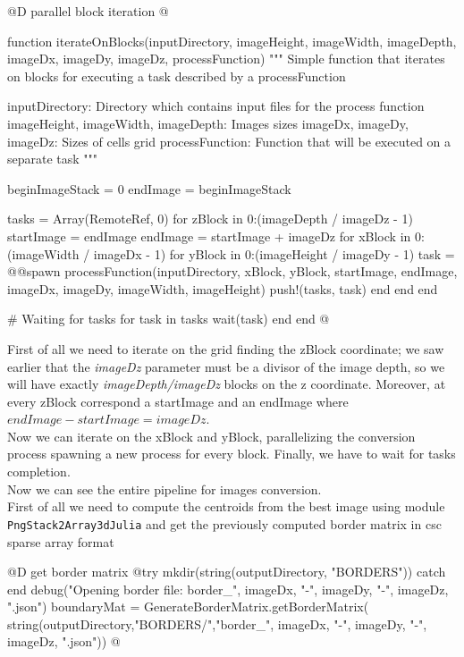 \documentclass[11pt,oneside]{article}	%
\begin{document}
@D parallel block iteration
@{function iterateOnBlocks(inputDirectory,
                         imageHeight, imageWidth, imageDepth,
                         imageDx, imageDy, imageDz,
                         processFunction)
  """
  Simple function that iterates on blocks for executing
  a task described by a processFunction

  inputDirectory: Directory which contains input files for the process function
  imageHeight, imageWidth, imageDepth: Images sizes
  imageDx, imageDy, imageDz: Sizes of cells grid
  processFunction: Function that will be executed on a separate task
  """

  beginImageStack = 0
  endImage = beginImageStack

  tasks = Array(RemoteRef, 0)
  for zBlock in 0:(imageDepth / imageDz - 1)
    startImage = endImage
    endImage = startImage + imageDz
    for xBlock in 0:(imageWidth / imageDx - 1)
      for yBlock in 0:(imageHeight / imageDy - 1)
        task = @@spawn processFunction(inputDirectory,
                                      xBlock, yBlock,
                                      startImage, endImage,
                                      imageDx, imageDy,
                                      imageWidth, imageHeight)
        push!(tasks, task)
      end
    end
  end

  # Waiting for tasks
  for task in tasks
    wait(task)
  end
end @}

First of all we need to iterate on the grid finding the zBlock coordinate; we saw earlier that the \textit{imageDz} parameter must be a divisor of the image depth, so we will have exactly \textit{imageDepth/imageDz} blocks on the z coordinate. Moreover, at every zBlock correspond a startImage and an endImage where $endImage - startImage = imageDz$.\\
Now we can iterate on the xBlock and yBlock, parallelizing the conversion process spawning a new process for every block. Finally, we have to wait for tasks completion.\\

Now we can see the entire pipeline for images conversion.\\

First of all we need to compute the centroids from the best image using module \texttt{PngStack2Array3dJulia} and get the previously computed border matrix in csc sparse array format

@D get border matrix
@{try
  mkdir(string(outputDirectory, "BORDERS"))
catch
end
debug("Opening border file: border_", imageDx, "-", imageDy, "-", imageDz, ".json")
boundaryMat = GenerateBorderMatrix.getBorderMatrix(
					string(outputDirectory,"BORDERS/","border_",
					imageDx, "-", imageDy, "-", imageDz, ".json"))
@}
\end{document}
